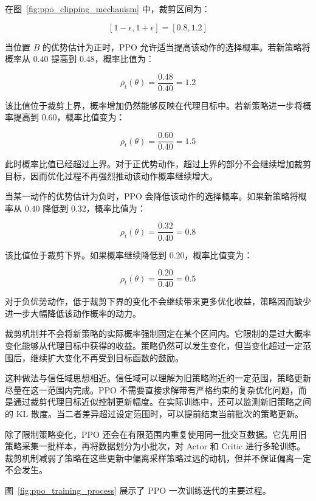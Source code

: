 \documentclass[UTF8,a4paper,zihao=-4,oneside,openany]{ctexbook}
\begin{document}
在图~\ref{fig:ppo_clipping_mechanism} 中，裁剪区间为：

\[
[1-\epsilon,1+\epsilon]=[0.8,1.2]
\]

当位置 $B$ 的优势估计为正时，PPO 允许适当提高该动作的选择概率。若新策略将概率从 $0.40$ 提高到 $0.48$，概率比值为：

\[
\rho_t(\theta)=\frac{0.48}{0.40}=1.2
\]

该比值位于裁剪上界，概率增加仍然能够反映在代理目标中。若新策略进一步将概率提高到 $0.60$，概率比值变为：

\[
\rho_t(\theta)=\frac{0.60}{0.40}=1.5
\]

此时概率比值已经超过上界。对于正优势动作，超过上界的部分不会继续增加裁剪目标，因而优化过程不再强烈推动该动作概率继续增大。

当某一动作的优势估计为负时，PPO 会降低该动作的选择概率。如果新策略将概率从 $0.40$ 降低到 $0.32$，概率比值为：

\[
\rho_t(\theta)=\frac{0.32}{0.40}=0.8
\]

该比值位于裁剪下界。如果概率继续降低到 $0.20$，概率比值变为：

\[
\rho_t(\theta)=\frac{0.20}{0.40}=0.5
\]

对于负优势动作，低于裁剪下界的变化不会继续带来更多优化收益，策略因而缺少进一步大幅降低该动作概率的动力。

裁剪机制并不会将新策略的实际概率强制固定在某个区间内。它限制的是过大概率变化能够从代理目标中获得的收益。策略仍然可以发生变化，但当变化超过一定范围后，继续扩大变化不再受到目标函数的鼓励。

这种做法与信任域思想相近。信任域可以理解为旧策略附近的一定范围，策略更新尽量在这一范围内完成。PPO 不需要直接求解带有严格约束的复杂优化问题，而是通过裁剪代理目标近似控制更新幅度。在实际训练中，还可以监测新旧策略之间的 KL 散度。当二者差异超过设定范围时，可以提前结束当前批次的策略更新。

除了限制策略变化，PPO 还会在有限范围内重复使用同一批交互数据。它先用旧策略采集一批样本，再将数据划分为小批次，对 Actor 和 Critic 进行多轮训练。裁剪机制减弱了策略在这些更新中偏离采样策略过远的动机，但并不保证偏离一定不会发生。

图~\ref{fig:ppo_training_process} 展示了 PPO 一次训练迭代的主要过程。

%     
\end{document}
